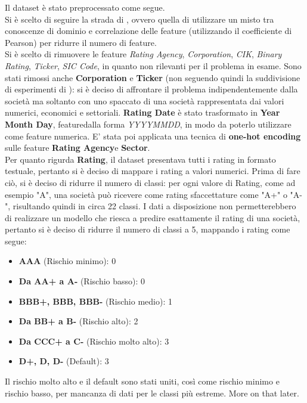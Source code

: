 \noindent Il dataset è stato preprocessato come segue. \\ Si è scelto di seguire la strada di \cite{makwana2022get}, ovvero quella di utilizzare un misto tra conoscenze di dominio e correlazione delle feature (utilizzando il coefficiente di Pearson) per ridurre il numero di feature. \\
Si è scelto di rimuovere le feature \textit{Rating Agency}, \textit{Corporation}, \textit{CIK}, \textit{Binary Rating}, \textit{Ticker}, \textit{SIC Code}, in quanto non rilevanti per il problema in esame. Sono stati rimossi anche \textbf{Corporation} e \textbf{Ticker} (non seguendo quindi la suddivisione di esperimenti di \cite{nguyen2021multimodal}): si è deciso di affrontare il problema indipendentemente dalla società ma soltanto con uno spaccato di una società rappresentata dai valori numerici, economici e settoriali. \textbf{Rating Date} è stato trasformato in \textbf{Year Month Day}, featuredalla forma \textit{YYYYMMDD}, in modo da poterlo utilizzare come feature numerica. E' stata poi applicata una tecnica di \textbf{one-hot encoding} sulle feature \textbf{Rating Agency}e \textbf{Sector}. \\ Per quanto rigurda \textbf{Rating}, il dataset presentava tutti i rating in formato testuale, pertanto si è deciso di mappare i rating a valori numerici. Prima di fare ciò, si è deciso di ridurre il numero di classi: per ogni valore di Rating, come ad esempio "A", una società può ricevere come rating sfaccettature come "A+" o "A-", risultando quindi in circa 22 classi. I dati a disposizione non permetterebbero di realizzare un modello che riesca a predire esattamente il rating di una società, pertanto si è deciso di ridurre il numero di classi a 5, mappando i rating come segue:
\begin{itemize}[label=-]
    \item \textbf{AAA} (Rischio minimo):  0
    \item \textbf{Da AA+ a A-} (Rischio basso):  0
    \item \textbf{BBB+, BBB, BBB-} (Rischio medio): 1
    \item \textbf{Da BB+ a B-} (Rischio alto): 2
    \item \textbf{Da CCC+ a C-} (Rischio molto alto): 3
    \item \textbf{D+, D, D-} (Default): 3
\end{itemize}
\noindent Il rischio molto alto e il default sono stati uniti, così come rischio minimo e rischio basso, per mancanza di dati per le classi più estreme. More on that later.
